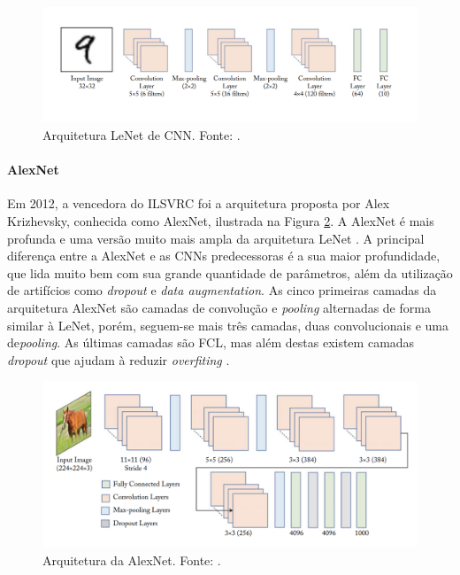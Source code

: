\begin{figure}[!ht]
	\centering
	\caption{Arquitetura LeNet de CNN. Fonte: \cite{ref:khan}.}
	\label{img:lenet}
	\includegraphics[width=1\textwidth]{./img/lenet}
\end{figure}


\paragraph{AlexNet} Em 2012, a vencedora do ILSVRC foi a arquitetura proposta por Alex Krizhevsky, conhecida como AlexNet, ilustrada na Figura \ref{img:alexnet}. A AlexNet é mais profunda e uma versão muito mais ampla da arquitetura LeNet \cite{ref:satapathy}. A principal diferença entre a AlexNet e as CNNs predecessoras é a sua maior profundidade, que lida muito bem com sua grande quantidade de parâmetros, além da utilização de artifícios como \textit{dropout} e \textit{data augmentation}. As cinco primeiras camadas da arquitetura AlexNet são camadas de convolução e \textit{pooling} alternadas de forma similar à LeNet, porém, seguem-se mais três camadas, duas convolucionais e uma de\textit{pooling}. As últimas camadas são FCL, mas além destas existem camadas \textit{dropout} que ajudam à reduzir \textit{overfiting} \cite{ref:khan}.

\begin{figure}[!ht]
	\centering
	\caption{Arquitetura da AlexNet. Fonte: \cite{ref:khan}.}
	\label{img:alexnet}
	\includegraphics[width=1\textwidth]{./img/alexnet}
\end{figure}

